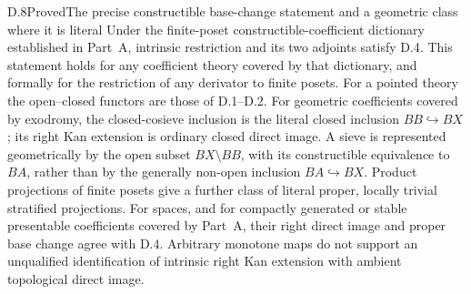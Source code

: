 \begin{statement}{D.8}{Proved}{The precise constructible base-change statement and a geometric class where it is literal}
Under the finite-poset constructible-coefficient dictionary established in Part~A, intrinsic restriction and its two adjoints satisfy D.4. This statement holds for any coefficient theory covered by that dictionary, and formally for the restriction of any derivator to finite posets. For a pointed theory the open--closed functors are those of D.1--D.2. For geometric coefficients covered by exodromy, the closed-cosieve inclusion is the literal closed inclusion $BB\hookrightarrow BX$; its right Kan extension is ordinary closed direct image. A sieve is represented geometrically by the open subset $BX\setminus BB$, with its constructible equivalence to $BA$, rather than by the generally non-open inclusion $BA\hookrightarrow BX$. Product projections of finite posets give a further class of literal proper, locally trivial stratified projections. For spaces, and for compactly generated or stable presentable coefficients covered by Part~A, their right direct image and proper base change agree with D.4. Arbitrary monotone maps do not support an unqualified identification of intrinsic right Kan extension with ambient topological direct image.
\end{statement}
